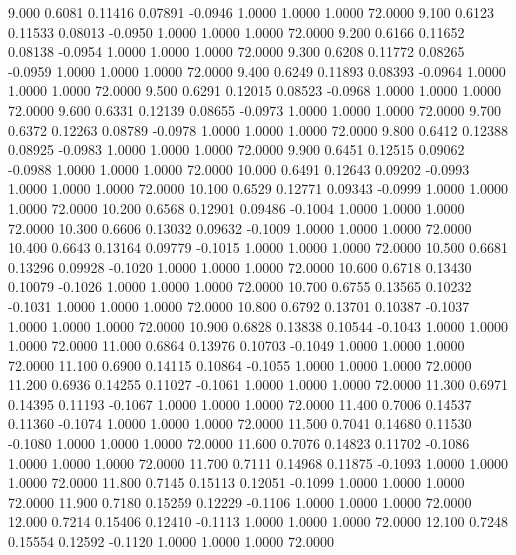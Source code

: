    9.000   0.6081   0.11416   0.07891  -0.0946   1.0000   1.0000   1.0000  72.0000
   9.100   0.6123   0.11533   0.08013  -0.0950   1.0000   1.0000   1.0000  72.0000
   9.200   0.6166   0.11652   0.08138  -0.0954   1.0000   1.0000   1.0000  72.0000
   9.300   0.6208   0.11772   0.08265  -0.0959   1.0000   1.0000   1.0000  72.0000
   9.400   0.6249   0.11893   0.08393  -0.0964   1.0000   1.0000   1.0000  72.0000
   9.500   0.6291   0.12015   0.08523  -0.0968   1.0000   1.0000   1.0000  72.0000
   9.600   0.6331   0.12139   0.08655  -0.0973   1.0000   1.0000   1.0000  72.0000
   9.700   0.6372   0.12263   0.08789  -0.0978   1.0000   1.0000   1.0000  72.0000
   9.800   0.6412   0.12388   0.08925  -0.0983   1.0000   1.0000   1.0000  72.0000
   9.900   0.6451   0.12515   0.09062  -0.0988   1.0000   1.0000   1.0000  72.0000
  10.000   0.6491   0.12643   0.09202  -0.0993   1.0000   1.0000   1.0000  72.0000
  10.100   0.6529   0.12771   0.09343  -0.0999   1.0000   1.0000   1.0000  72.0000
  10.200   0.6568   0.12901   0.09486  -0.1004   1.0000   1.0000   1.0000  72.0000
  10.300   0.6606   0.13032   0.09632  -0.1009   1.0000   1.0000   1.0000  72.0000
  10.400   0.6643   0.13164   0.09779  -0.1015   1.0000   1.0000   1.0000  72.0000
  10.500   0.6681   0.13296   0.09928  -0.1020   1.0000   1.0000   1.0000  72.0000
  10.600   0.6718   0.13430   0.10079  -0.1026   1.0000   1.0000   1.0000  72.0000
  10.700   0.6755   0.13565   0.10232  -0.1031   1.0000   1.0000   1.0000  72.0000
  10.800   0.6792   0.13701   0.10387  -0.1037   1.0000   1.0000   1.0000  72.0000
  10.900   0.6828   0.13838   0.10544  -0.1043   1.0000   1.0000   1.0000  72.0000
  11.000   0.6864   0.13976   0.10703  -0.1049   1.0000   1.0000   1.0000  72.0000
  11.100   0.6900   0.14115   0.10864  -0.1055   1.0000   1.0000   1.0000  72.0000
  11.200   0.6936   0.14255   0.11027  -0.1061   1.0000   1.0000   1.0000  72.0000
  11.300   0.6971   0.14395   0.11193  -0.1067   1.0000   1.0000   1.0000  72.0000
  11.400   0.7006   0.14537   0.11360  -0.1074   1.0000   1.0000   1.0000  72.0000
  11.500   0.7041   0.14680   0.11530  -0.1080   1.0000   1.0000   1.0000  72.0000
  11.600   0.7076   0.14823   0.11702  -0.1086   1.0000   1.0000   1.0000  72.0000
  11.700   0.7111   0.14968   0.11875  -0.1093   1.0000   1.0000   1.0000  72.0000
  11.800   0.7145   0.15113   0.12051  -0.1099   1.0000   1.0000   1.0000  72.0000
  11.900   0.7180   0.15259   0.12229  -0.1106   1.0000   1.0000   1.0000  72.0000
  12.000   0.7214   0.15406   0.12410  -0.1113   1.0000   1.0000   1.0000  72.0000
  12.100   0.7248   0.15554   0.12592  -0.1120   1.0000   1.0000   1.0000  72.0000
